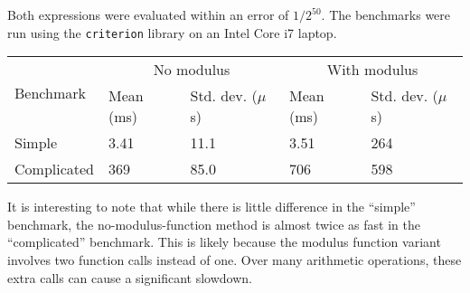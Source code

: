 \documentclass[leqno]{report}
\begin{document}
Both expressions were evaluated within an error of $1/2^{50}$. The benchmarks were run using the \texttt{criterion} library on an Intel Core i7 laptop.

\begin{tabular}{lllll}
    \toprule
    \multirow{2}{*}{Benchmark} &
    \multicolumn{2}{c}{No modulus} &
    \multicolumn{2}{c}{With modulus} \\
    \cmidrule(l){2-5}
    & Mean (ms) & Std. dev. ($\mu$s) & Mean (ms) & Std. dev. ($\mu$s) \\
    \midrule
    Simple & 3.41 & 11.1 & 3.51 & 264 \\
    Complicated & 369 & 85.0 & 706 & 598 \\
    \bottomrule
\end{tabular}

It is interesting to note that while there is little difference in the ``simple'' benchmark, the no-modulus-function method is almost twice as fast in the ``complicated'' benchmark. This is likely because the modulus function variant involves two function calls instead of one. Over many arithmetic operations, these extra calls can cause a significant slowdown.



\end{document}

